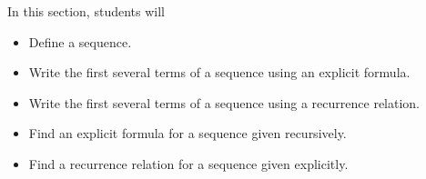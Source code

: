 \documentclass{ximera}
\begin{document}
\begin{sectionOutcomes}

In this section, students will

\begin{itemize}
\item Define a sequence.
\item Write the first several terms of a sequence using an explicit formula.
\item Write the first several terms of a sequence using a recurrence
  relation.
\item Find an explicit formula for a sequence given recursively.
\item Find a recurrence relation for a sequence given explicitly.
\end{itemize}

\end{sectionOutcomes}
\end{document}
